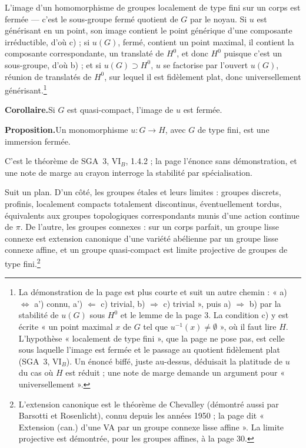 \documentclass[11pt,a4paper]{article}
\begin{document}
L'image d'un homomorphisme de groupes localement de type fini sur un corps
est fermée --- c'est le sous-groupe fermé quotient de $G$ par le noyau. Si
$u$ est générisant en un point, son image contient le point générique d'une
composante irréductible, d'où c) ; si $u(G)$, fermé, contient un point
maximal, il contient la composante correspondante, un translaté de $H^{0}$,
et donc $H^{0}$ puisque c'est un sous-groupe, d'où b) ; et si
$u(G) \supset H^{0}$, $u$ se factorise par l'ouvert $u(G)$, réunion de
translatés de $H^{0}$, sur lequel il est fidèlement plat, donc
universellement générisant.\footnote{La démonstration de la page est plus
courte et suit un autre chemin : « a) $\Leftrightarrow$ a') connu,
a') $\Leftarrow$ c) trivial, b) $\Rightarrow$ c) trivial », puis
a) $\Rightarrow$ b) par la stabilité de $u(G)$ sous $H^{0}$ et le lemme de la
page 3. La condition c) y est écrite « un point maximal $x$ de $G$ tel que
$u^{-1}(x) \neq \emptyset$ », où il faut lire $H$. L'hypothèse « localement
de type fini », que la page ne pose pas, est celle sous laquelle l'image est
fermée et le passage au quotient fidèlement plat (SGA~3, VI$_{B}$). Un
énoncé biffé, juste au-dessus, déduisait la platitude de $u$ du cas où $H$
est réduit ; une note de marge demande un argument pour « universellement ».}

\textbf{Corollaire.}\quad Si $G$ est quasi-compact, l'image de $u$ est fermée.

\textbf{Proposition.}\quad Un monomorphisme $u \colon G \to H$, avec $G$ de type fini, est une immersion
fermée.

C'est le théorème de SGA~3, VI$_{B}$, 1.4.2 ; la page l'énonce sans
démonstration, et une note de marge au crayon interroge la stabilité par
spécialisation.

Suit un plan. D'un côté, les groupes étales et leurs limites : groupes
discrets, profinis, localement compacts totalement discontinus, éventuellement
tordus, équivalents aux groupes topologiques correspondants munis d'une
action continue de $\pi$. De l'autre, les groupes connexes : sur un corps
parfait, un groupe lisse connexe est extension canonique d'une variété
abélienne par un groupe lisse connexe affine, et un groupe quasi-compact est
limite projective de groupes de type fini.\footnote{L'extension canonique est
le théorème de Chevalley (démontré aussi par Barsotti et Rosenlicht), connu
depuis les années 1950 ; la page dit « Extension (can.) d'une VA par un groupe
connexe lisse affine ». La limite projective est démontrée, pour les groupes
affines, à la page 30.}
\end{document}
